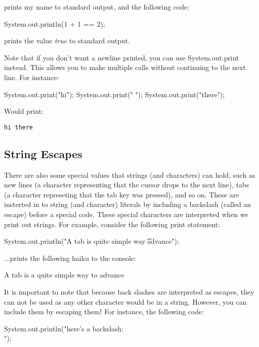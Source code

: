 prints my name to standard output, and the following code:

\begin{code}
System.out.println(1 + 1 == 2);
\end{code}

prints the value \textit{true} to standard output.  

Note that if you don't want a newline printed, you can use System.out.print instead. This allows you to make multiple calls without continuing to the next line. For instance:
\begin{code}
System.out.print("hi");
System.out.print(" ");
System.out.print("there");
\end{code}

Would print:

\begin{verbatim}
hi there
\end{verbatim}


\subsection{String Escapes}


There are also some special values that strings (and characters) can hold, such as new lines (a character representing that the cursor drops to the next line), tabs (a character represeting that the tab key was pressed), and so on. These are insterted in to string (and character) literals by including a backslash (called an escape) before a special code. These special characters are interpreted when we print out strings. For example, consider the following print statement:

\begin{code}
System.out.println("A tab is \n\ta quite simple way \n\t\tto advance");
\end{code}

...prints the following haiku to the console:

\begin{code}
A tab is
	a quite simple way
		to advance
\end{code}

It is important to note that because back slashes are interpreted as escapes, they can not be used as any other character would be in a string. However, you can include them by escaping them! For instance, the following code:

\begin{code}
System.out.println("here's a backslash: \\");
\end{code}

